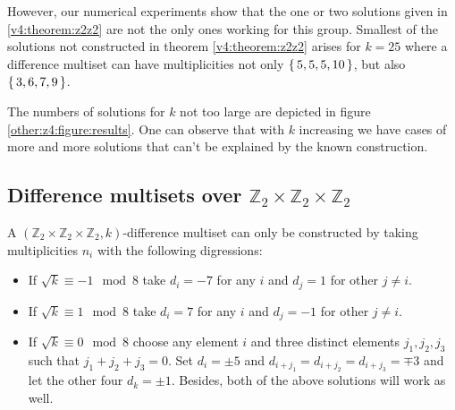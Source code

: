     However, our numerical experiments show that the one or two solutions given in \ref{v4:theorem:z2z2} are not the only ones working for this group. Smallest of the solutions not constructed in theorem \ref{v4:theorem:z2z2} arises for $k=25$ where a difference multiset can have multiplicities not only $\set{5,5,5,10}$, but also $\set{3,6,7,9}$. 

    The numbers of solutions for $k$ not too large are depicted in figure \ref{other:z4:figure:results}. One can observe that with $k$ increasing we have cases of more and more solutions that can't be explained by the known construction.
    
\subsection{Difference multisets over $\mathbb Z_2 \times \mathbb Z_2 \times \mathbb Z_2$}
    \begin{theorem}
        A $(\mathbb Z_2 \times \mathbb Z_2 \times \mathbb Z_2, k)$-difference multiset can only be constructed by taking multiplicities $n_i$ with the following digressions:
        \begin{itemize}
            \item If $\sqrt k \equiv -1 \mod 8$ take $d_i=-7$ for any $i$ and $d_j=1$ for other $j\neq i$.
            \item If $\sqrt k \equiv 1 \mod 8$ take $d_i=7$ for any $i$ and $d_j=-1$ for other $j\neq i$.
            \item If $\sqrt k \equiv 0 \mod 8$ choose any element $i$ and three distinct elements $j_1,j_2,j_3$ such that $j_1+j_2+j_3=0$. Set $d_i=\pm 5$ and $d_{i+j_1}=d_{i+j_2}=d_{i+j_3}=\mp 3$ and let the other four $d_k = \pm 1$. Besides, both of the above solutions will work as well.
        \end{itemize}
    \end{theorem}
    
